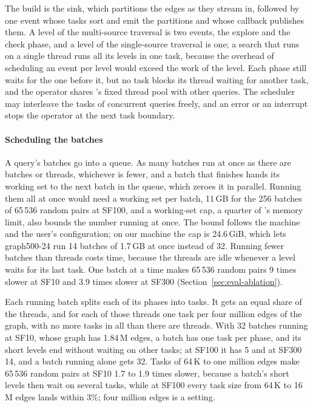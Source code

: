 The build is the sink, which partitions the edges as they stream in, followed by one event whose tasks sort and
emit the partitions and whose callback publishes them. A level of the multi-source traversal is two events, the
explore and the check phase, and a level of the single-source traversal is one; a search that runs on a single thread
runs all its levels in one task, because the overhead of scheduling an event per level would exceed the work
of the level. Each phase still waits
for the one before it, but no task blocks its thread waiting for another task, and the operator shares \duckdb's
fixed thread pool with other queries. The scheduler may interleave the tasks of concurrent queries freely,
and an error or an interrupt stops the operator at the next task boundary.

\paragraph{Scheduling the batches} A query's batches go into a queue. As many batches run at once as there are
batches or threads, whichever is fewer, and a batch that finishes hands its working set to the next batch in the
queue, which zeroes it in parallel. Running them all at once would need a working set per batch, 11\,GB for the 256
batches of 65\,536 random pairs at SF100, and a working-set cap, a quarter of \duckdb's memory limit, also bounds
the number running at once. The bound follows the machine and the user's configuration; on our machine the cap
is 24.6\,GiB, which lets graph500-24 run 14 batches of 1.7\,GB at once instead of 32. Running fewer batches than threads
costs time, because the threads are idle whenever a level waits for its last task. One batch at a time makes 65\,536
random pairs 9 times slower at SF10 and 3.9 times slower at SF300 (Section~\ref{sec:eval-ablation}).

Each running batch splits each of its phases into tasks. It gets an equal share of the threads, and for each of
those threads one task per four million edges of the graph, with no more tasks in all than there are threads. With 32
batches running at SF10, whose graph has 1.84\,M edges, a batch has one task per phase, and its short levels end
without waiting on other tasks; at SF100 it has 5 and at SF300 14, and a batch running alone gets 32. Tasks of 64\,K to one million edges make 65\,536 random pairs at SF10 1.7 to 1.9 times slower, because a batch's short levels then wait on several tasks, while at SF100 every task size from 64\,K to 16\,M edges lands within 3\%; four million edges is a setting.

